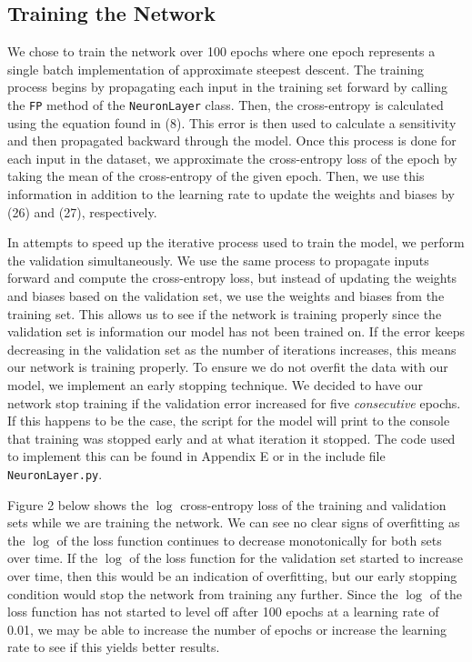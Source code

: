 \documentclass[12pt,halfline,a4paper]{ouparticle}
\begin{document}
\subsection{Training the Network}
We chose to train the network over 100 epochs where one epoch represents a single batch implementation of approximate steepest descent. The training process begins by propagating each input in the training set forward by calling the \verb|FP| method of the \verb|NeuronLayer| class. Then, the cross-entropy is calculated using the equation found in (8). This error is then used to calculate a sensitivity and then propagated backward through the model. Once this process is done for each input in the dataset, we approximate the cross-entropy loss of the epoch by taking the mean of the cross-entropy of the given epoch. Then, we use this information in addition to the learning rate to update the weights and biases by (26) and (27), respectively. 

In attempts to speed up the iterative process used to train the model, we perform the validation simultaneously.  We use the same process to propagate inputs forward and compute the cross-entropy loss, but instead of updating the weights and biases based on the validation set, we use the weights and biases from the training set. This allows us to see if the network is training properly since the validation set is information our model has not been trained on. If the error keeps decreasing in the validation set as the number of iterations increases, this means our network is training properly. To ensure we do not overfit the data with our model, we implement an early stopping technique. We decided to have our network stop training if the validation error increased for five \emph{consecutive} epochs. If this happens to be the case, the script for the model will print to the console that training was stopped early and at what iteration it stopped. The code used to implement this can be found in Appendix E or in the include file \verb|NeuronLayer.py|.  

Figure 2 below shows the $\log$ cross-entropy loss of the training and validation sets while we are training the network. We can see no clear signs of overfitting as the $\log$ of the loss function continues to decrease monotonically for both sets over time. If the $\log$ of the loss function for the validation set started to increase over time, then this would be an indication of overfitting, but our early stopping condition would stop the network from training any further. Since the $\log$ of the loss function has not started to level off after 100 epochs at a learning rate of 0.01, we may be able to increase the number of epochs or increase the learning rate to see if this yields better results. 
\end{document}

